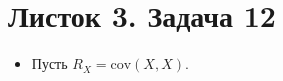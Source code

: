 




\section{Листок 3. Задача 12}

\begin{itemize}
\item Пусть $R_X = \text{cov}\left(X, X\right)$.



\end{itemize}
